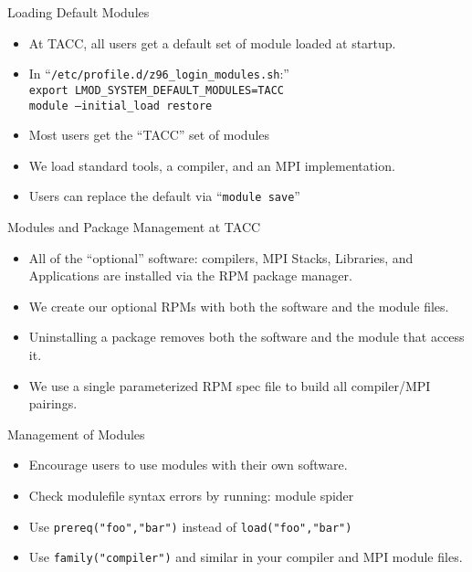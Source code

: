 \documentclass{beamer}
\begin{document}
\begin{frame}{Loading Default Modules}
  \begin{itemize}
    \item At TACC, all users get a default set of module loaded at startup.
    \item In ``\texttt{/etc/profile.d/z96\_login\_modules.sh}:'' \\
      {\color{blue}\texttt{export LMOD\_SYSTEM\_DEFAULT\_MODULES=TACC}}\\
      {\color{blue}\texttt{module --initial\_load restore}}
    \item Most users get the ``TACC'' set of modules
    \item We load standard tools, a compiler, and an MPI implementation.
    \item Users can replace the default via ``{\color{blue}\texttt{module save}}''
  \end{itemize}
\end{frame}

\begin{frame}{Modules and Package Management at TACC}
  \begin{itemize}
    \item All of the ``optional'' software: compilers, MPI Stacks,
      Libraries, and Applications are installed via the RPM package manager.
    \item We create our optional RPMs with both the software and the
      module files.
    \item Uninstalling a package removes both the software and the
      module that access it.
    \item We use a single parameterized RPM spec file to build all
      compiler/MPI pairings.
  \end{itemize}
\end{frame}

\begin{frame}{Management of Modules}
  \begin{itemize}
    \item Encourage users to use modules with their own software.
    \item Check modulefile syntax errors by running:
       {\color{blue}module spider}
    \item Use {\color{violet}\texttt{prereq("foo","bar")}} instead of
      {\color{violet}\texttt{load("foo","bar")}}
    \item Use  {\color{violet}\texttt{family("compiler")}} and similar
      in your compiler and MPI module files.
  \end{itemize}
\end{frame}
\end{document}
